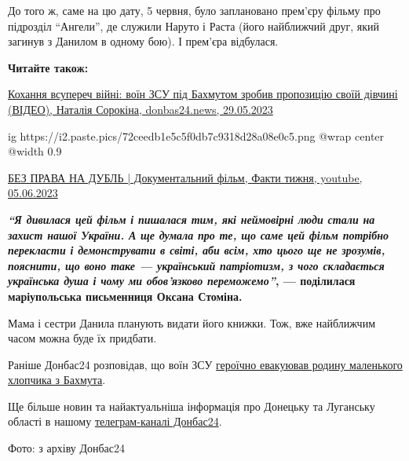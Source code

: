До того ж, саме на цю дату, 5 червня, було заплановано прем'єру фільму про
підрозділ \enquote{Ангели}, де служили Наруто і Раста (його найближчий друг, який
загинув з Данилом в одному бою). І прем'єра відбулася.

\textbf{Читайте також:} 

\href{https://donbas24.news/news/koxannya-vsuperec-viini-voyin-zsu-pid-baxmutom-zrobiv-propoziciyu-svoyii-divcini-video}{%
Кохання всупереч війні: воїн ЗСУ під Бахмутом зробив пропозицію своїй дівчині (ВІДЕО), %
Наталія Сорокіна, donbas24.news, 29.05.2023%
}

\ifcmt
  ig https://i2.paste.pics/72ceedb1e5c5f0db7c9318d28a08e0c5.png
  @wrap center
  @width 0.9
\fi

\href{https://youtu.be/eQQ6MhdL8LQ}{%
БЕЗ ПРАВА НА ДУБЛЬ | Документальний фільм, Факти тижня, youtube, 05.06.2023%
}

\begin{leftbar}
	\begingroup
		\bfseries
{\color{blue}\em\enquote{Я дивилася цей фільм і пишалася тим, які неймовірні люди стали на захист
нашої України. А ще думала про те, що саме цей фільм потрібно
перекласти і демонструвати в світі, аби всім, хто цього ще не зрозумів,
пояснити, що воно таке — український патріотизм, з чого складається
українська душа і чому ми обов'язково переможемо}}, — поділилася
маріупольська письменниця Оксана Стоміна.
	\endgroup
\end{leftbar}

Мама і сестри Данила планують видати його книжки. Тож, вже найближчим часом
можна буде їх придбати.

Раніше Донбас24 розповідав, що воїн ЗСУ \href{https://donbas24.news/news/voyin-zsu-geroyicno-evakuyuvav-rodinu-malenkkogo-xlopcika-z-baxmuta-video}{героїчно евакуював родину маленького
хлопчика з Бахмута}.

Ще більше новин та найактуальніша інформація про Донецьку та Луганську області
в нашому \href{https://t.me/donbas24}{телеграм-каналі Донбас24}.

Фото: з архіву Донбас24

